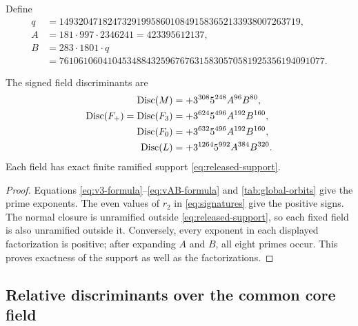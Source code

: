 Define
\begin{align}
 q&=14932047182473291995860108491583652133938007263719,
 \label{eq:q-definition}\\
 A&=181\cdot997\cdot2346241=423395612137,
 \label{eq:A-definition}\\
 B&=283\cdot1801\cdot q\\
  &=7610610604104534884325967676315830570581925356194091077.
 \label{eq:B-definition}
\end{align}

\begin{proposition}
\label{prop:absolute-discriminants}
The signed field discriminants are
\begin{align*}
 \operatorname{Disc}(M)&=+3^{308}5^{248}A^{96}B^{80},\\
 \operatorname{Disc}(F_{+})=\operatorname{Disc}(F_{3})
  &=+3^{624}5^{496}A^{192}B^{160},\\
 \operatorname{Disc}(F_{0})&=+3^{632}5^{496}A^{192}B^{160},\\
 \operatorname{Disc}(L)&=+3^{1264}5^{992}A^{384}B^{320}.
\end{align*}
Each field has exact finite ramified support \eqref{eq:released-support}.
\end{proposition}

\begin{proof}
Equations \eqref{eq:v3-formula}--\eqref{eq:vAB-formula} and
\cref{tab:global-orbits} give the prime exponents.  The even values of $r_2$
in \eqref{eq:signatures} give the positive signs.  The normal closure is
unramified outside \eqref{eq:released-support}, so each fixed field is also
unramified outside it.  Conversely, every exponent in each displayed
factorization is positive; after expanding $A$ and $B$, all eight primes
occur.  This proves exactness of the support as well as the factorizations.
\end{proof}

\subsection{Relative discriminants over the common core field}

